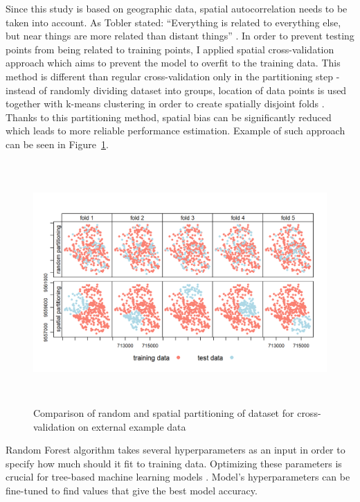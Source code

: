 \documentclass{amuthesis}
\begin{document}
Since this study is based on geographic data, spatial autocorrelation
needs to be taken into account. As Tobler stated: ``Everything is
related to everything else, but near things are more related than
distant things'' \autocite{tobler_computer_1970}. In order to prevent
testing points from being related to training points, I applied spatial
cross-validation approach which aims to prevent the model to overfit to
the training data. This method is different than regular
cross-validation only in the partitioning step - instead of randomly
dividing dataset into groups, location of data points is used together
with k-means clustering \autocite{brenning_spatial_2012} in order to
create spatially disjoint folds \autocite{lovelace_geocomputation_2019}.
Thanks to this partitioning method, spatial bias can be significantly
reduced which leads to more reliable performance estimation. Example of
such approach can be seen in Figure~\ref{fig-rycina5}.

\begin{figure}[H]

{\centering \includegraphics[width=5.9375in,height=3.64583in]{./figures/spatial_partitioning.png}

}

\caption{\label{fig-rycina5}Comparison of random and spatial
partitioning of dataset for cross-validation on external example data
\autocite[Source:][]{lovelace_geocomputation_2019}}

\end{figure}

Random Forest algorithm takes several hyperparameters as an input in
order to specify how much should it fit to training data. Optimizing
these parameters is crucial for tree-based machine learning models
\autocite{yang_hyperparameter_2020}. Model's hyperparameters can be
fine-tuned to find values that give the best model accuracy.
\end{document}
